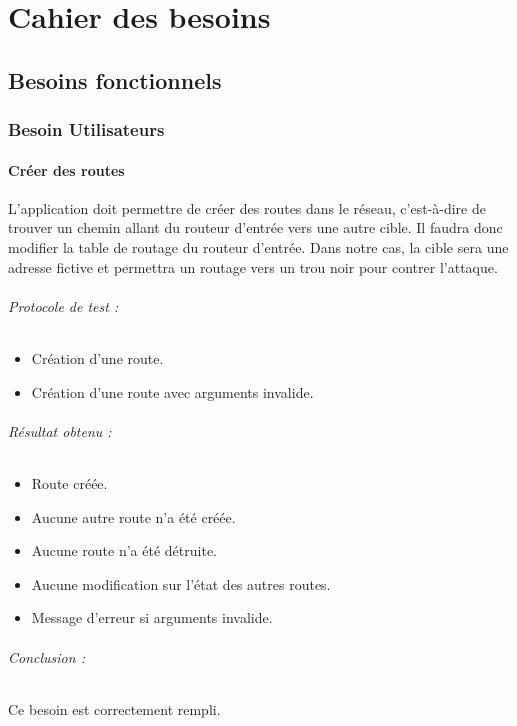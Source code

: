 \chapter{Cahier des besoins}

\section{Besoins fonctionnels}

\subsection{Besoin Utilisateurs}
\subsubsection{Créer des routes}
L'application doit permettre de créer des routes dans le réseau, c'est-à-dire de trouver un chemin allant du routeur d'entrée vers une autre cible. Il faudra donc modifier la table de routage du routeur d'entrée. Dans notre cas, la cible sera une adresse fictive et permettra un routage vers un trou noir pour contrer l'attaque.
\subparagraph{Protocole de test :}
\begin{itemize}
    \item Création d'une route.
    \item Création d'une route avec arguments invalide.
\end{itemize}
\subparagraph{Résultat obtenu :}
    \begin{itemize}
    \item Route créée.
    \item Aucune autre route n'a été créée.
    \item Aucune route n'a été détruite.
    \item Aucune modification sur l'état des autres routes.
    \item Message d'erreur si arguments invalide.
\end{itemize}
\subparagraph{Conclusion :}Ce besoin est correctement rempli.

